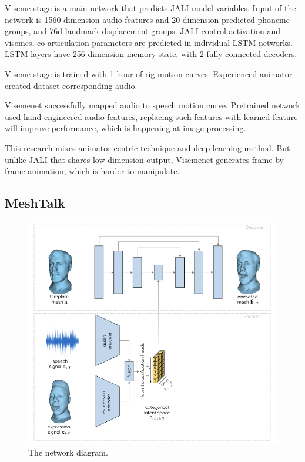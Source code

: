 \documentclass[10pt,twocolumn,letterpaper]{article}
\begin{document}
Viseme stage is a main network that predicts JALI model variables. Input of the network is 1560 dimension audio features and 20 dimension predicted phoneme groups, and 76d landmark displacement groups. JALI control activation and visemes, co-articulation parameters are predicted in individual LSTM networks. LSTM layers have 256-dimension memory state, with 2 fully connected decoders.

Viseme stage is trained with 1 hour of rig motion curves. Experienced animator created dataset corresponding audio.

Visemenet successfully mapped audio to speech motion curve. Pretrained network used hand-engineered audio features, replacing such features with learned feature will improve performance, which is happening at image processing.

This research mixes animator-centric technique and deep-learning method. But unlike JALI that shares low-dimension output, Visemenet generates frame-by-frame animation, which is harder to manipulate.

\subsection{MeshTalk}

\begin{figure}[t]
   \begin{center}
   \includegraphics[width=0.8\linewidth]{meshtalk_overview.png}
   \end{center}
   \caption{The network diagram\cite{richardMeshTalk3DFace2021}.}
   \label{fig:long}
   \label{fig:networkdiag}
 \end{figure}
\end{document}
